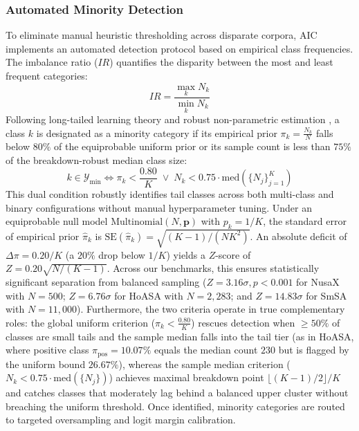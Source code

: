 \documentclass{ieeeaccess}
\begin{document}
\subsubsection{Automated Minority Detection}
To eliminate manual heuristic thresholding across disparate corpora, AIC implements an automated detection protocol based on empirical class frequencies. The imbalance ratio ($IR$) quantifies the disparity between the most and least frequent categories:
\begin{equation}
\label{eq:imbalance_ratio}
    IR = \frac{\max_k N_k}{\min_k N_k}
\end{equation}
Following long-tailed learning theory \cite{he2009learning, menon2021longtail} and robust non-parametric estimation \cite{buda2018systematic, huber1981robust}, a class $k$ is designated as a minority category if its empirical prior $\pi_k = \frac{N_k}{N}$ falls below $80\%$ of the equiprobable uniform prior or its sample count is less than $75\%$ of the breakdown-robust median class size:
\begin{equation}
\label{eq:minority_detection}
    k \in \mathcal{Y}_{\text{min}} \iff \pi_k < \frac{0.80}{K} \;\lor\; N_k < 0.75 \cdot \mathrm{med}(\{N_j\}_{j=1}^K)
\end{equation}
This dual condition robustly identifies tail classes across both multi-class and binary configurations without manual hyperparameter tuning. Under an equiprobable null model $\text{Multinomial}(N, \mathbf{p})$ with $p_k = 1/K$, the standard error of empirical prior $\hat{\pi}_k$ is $\text{SE}(\hat{\pi}_k) = \sqrt{(K-1)/(N K^2)}$. An absolute deficit of $\Delta \pi = 0.20/K$ (a $20\%$ drop below $1/K$) yields a $Z$-score of $Z = 0.20 \sqrt{N/(K-1)}$. Across our benchmarks, this ensures statistically significant separation from balanced sampling ($Z = 3.16\sigma, p < 0.001$ for NusaX with $N=500$; $Z = 6.76\sigma$ for HoASA with $N=2{,}283$; and $Z = 14.83\sigma$ for SmSA with $N=11{,}000$). Furthermore, the two criteria operate in true complementary roles: the global uniform criterion ($\pi_k < \frac{0.80}{K}$) rescues detection when $\ge 50\%$ of classes are small tails and the sample median falls into the tail tier (as in HoASA, where positive class $\pi_{\text{pos}}=10.07\%$ equals the median count $230$ but is flagged by the uniform bound $26.67\%$), whereas the sample median criterion ($N_k < 0.75 \cdot \text{med}(\{N_j\})$) achieves maximal breakdown point $\lfloor (K-1)/2 \rfloor / K$ \cite{huber1981robust} and catches classes that moderately lag behind a balanced upper cluster without breaching the uniform threshold. Once identified, minority categories are routed to targeted oversampling and logit margin calibration.
\end{document}
